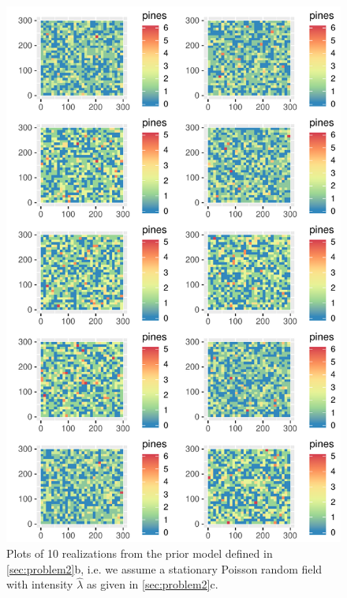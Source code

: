 \begin{figure}
    \centering
    \includegraphics{figures/p2_prior_sims.pdf}
    \caption{Plots of 10 realizations from the prior model defined in \ref{sec:problem2}b, i.e. we assume a stationary Poisson random field with intensity $\hat{\lambda}$ as given in \ref{sec:problem2}c.}
    \label{fig:p2_prior_sims}
\end{figure}

